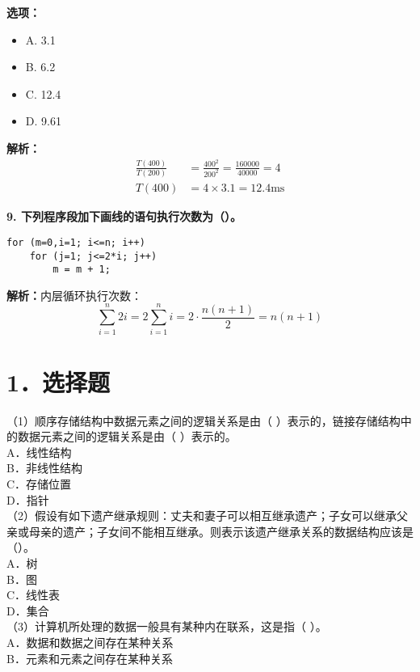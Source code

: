 \documentclass[12pt,a4paper]{amsart}
\begin{document}
\textbf{选项：}
\begin{itemize}
\item A. 3.1
\item B. 6.2
\item C. 12.4
\item D. 9.61
\end{itemize}

\textbf{解析：}
\begin{align}
\frac{T(400)}{T(200)} &= \frac{400^2}{200^2} = \frac{160000}{40000} = 4\\
T(400) &= 4 \times 3.1 = 12.4 \text{ms}
\end{align}

\textbf{9. 下列程序段加下画线的语句执行次数为（）。}

\begin{lstlisting}
for (m=0,i=1; i<=n; i++)
    for (j=1; j<=2*i; j++)
        m = m + 1;
\end{lstlisting}

\textbf{解析：}内层循环执行次数：
$$\sum_{i=1}^{n} 2i = 2\sum_{i=1}^{n} i = 2 \cdot \frac{n(n+1)}{2} = n(n+1)$$
\section*{1．选择题}
（1）顺序存储结构中数据元素之间的逻辑关系是由（ ）表示的，链接存储结构中的数据元素之间的逻辑关系是由（ ）表示的。\\
A．线性结构\\
B．非线性结构\\
C．存储位置\\
D．指针\\
（2）假设有如下遗产继承规则：丈夫和妻子可以相互继承遗产；子女可以继承父亲或母亲的遗产；子女间不能相互继承。则表示该遗产继承关系的数据结构应该是（）。\\
A．树\\
B．图\\
C．线性表\\
D．集合\\
（3）计算机所处理的数据一般具有某种内在联系，这是指（ ）。\\
A．数据和数据之间存在某种关系\\
B．元素和元素之间存在某种关系
\end{document}
